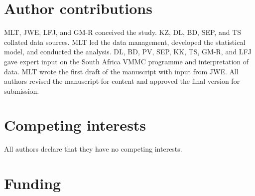 \documentclass{article}
\begin{document}

\section*{Author contributions}


MLT, JWE, LFJ, and GM-R conceived the study. KZ, DL, BD, SEP, and TS collated data sources. MLT led the data management, developed the statistical model, and conducted the analysis. DL, BD, PV, SEP, KK, TS, GM-R, and LFJ gave expert input on the South Africa VMMC programme and interpretation of data. MLT wrote the first draft of the manuscript with input from JWE. All authors revised the manuscript for content and approved the final version for submission.


\section*{Competing interests}


All authors declare that they have no competing interests. 


\section*{Funding}

\end{document}
